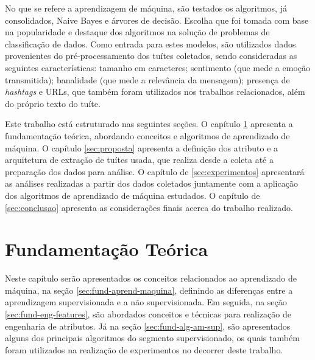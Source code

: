 \documentclass[oneside,openright,12pt]{ufsm_2015} %
\begin{document}
{    \par No que se refere a aprendizagem de máquina, são testados os algoritmos, já consolidados, Naive Bayes e árvores de decisão. Escolha que foi tomada com base na popularidade e destaque dos algoritmos na solução de problemas de classificação de dados. Como entrada para estes modelos, são utilizados dados provenientes do pré-processamento dos tuítes coletados, sendo consideradas as seguintes características: tamanho em caracteres; sentimento (que mede a emoção transmitida); banalidade (que mede a relevância da mensagem); presença de \textit{hashtags} e URLs, que também foram utilizados nos trabalhos relacionados, além do próprio texto do tuíte.

    \par Este trabalho está estruturado nas seguintes seções. O capítulo \ref{sec:fund-teorica} apresenta a fundamentação teórica, abordando conceitos e algoritmos de aprendizado de máquina. O capítulo \ref{sec:proposta} apresenta a definição dos atributo e a arquitetura de extração de tuítes usada, que realiza desde a coleta até a preparação dos dados para análise. O capítulo de \ref{sec:experimentos} apresentará as análises realizadas a partir dos dados coletados juntamente com a aplicação dos algoritmos de aprendizado de máquina estudados. O capítulo de \ref{sec:conclusao} apresenta as considerações finais acerca do trabalho realizado.


}
\geraintro  %


\chapter{Fundamentação Teórica}
\label{sec:fund-teorica}

    \par Neste capítulo serão apresentados os conceitos relacionados ao aprendizado de máquina, na seção \ref{sec:fund-aprend-maquina}, definindo as diferenças entre a aprendizagem supervisionada e a não supervisionada. Em seguida, na seção \ref{sec:fund-eng-features}, são abordados conceitos e técnicas para realização de engenharia de atributos. Já na seção \ref{sec:fund-alg-am-sup}, são apresentados alguns dos principais algoritmos do segmento supervisionado, os quais também foram utilizados na realização de experimentos no decorrer deste trabalho.
\end{document}
